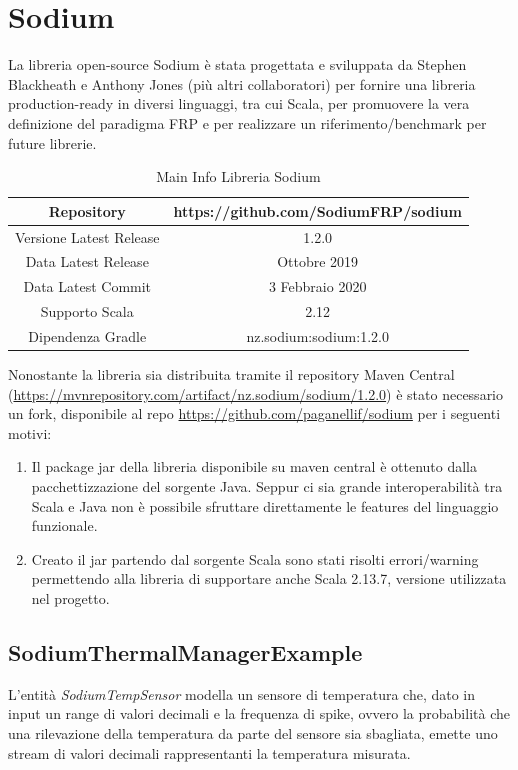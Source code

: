 \documentclass[../main.tex]{subfiles}
\begin{document}
\section{Sodium}
La libreria open-source Sodium è stata progettata e sviluppata da Stephen Blackheath e Anthony Jones (più altri collaboratori) per fornire una libreria production-ready in diversi linguaggi, tra cui Scala, per promuovere la vera definizione del paradigma FRP e per realizzare un riferimento/benchmark per future librerie.

\begin{table}[H]
\centering
\begin{tabular}{|c|c|}
     \hline
     Repository & https://github.com/SodiumFRP/sodium \\
     \hline
     Versione Latest Release & 1.2.0 \\
     \hline
     Data Latest Release & Ottobre 2019 \\
     \hline
     Data Latest Commit & 3 Febbraio 2020 \\
     \hline
     Supporto Scala & 2.12 \\
     \hline
     Dipendenza Gradle & nz.sodium:sodium:1.2.0 \\
     \hline
\end{tabular}
\caption{Main Info Libreria Sodium}
\end{table}

Nonostante la libreria sia distribuita tramite il repository Maven Central (\url{https://mvnrepository.com/artifact/nz.sodium/sodium/1.2.0}) è stato necessario un fork, disponibile al repo \url{https://github.com/paganellif/sodium} per i seguenti motivi:
\begin{enumerate}
    \item Il package jar della libreria disponibile su maven central è ottenuto dalla pacchettizzazione del sorgente Java. Seppur ci sia grande interoperabilità tra Scala e Java non è possibile sfruttare direttamente le features del linguaggio funzionale. 
    \item Creato il jar partendo dal sorgente Scala sono stati risolti errori/warning permettendo alla libreria di supportare anche Scala 2.13.7, versione utilizzata nel progetto.
\end{enumerate}

\subsection{SodiumThermalManagerExample}
L'entità \textit{SodiumTempSensor} modella un sensore di temperatura che, dato in input un range di valori decimali e la frequenza di spike, ovvero la probabilità che una rilevazione della temperatura da parte del sensore sia sbagliata, emette uno stream di valori decimali rappresentanti la temperatura misurata.
\end{document}
